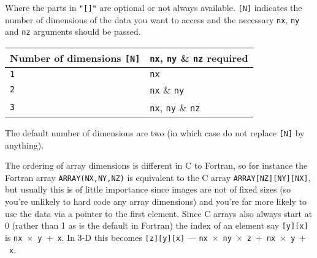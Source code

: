 \documentclass[twoside,11pt,nolof]{starlink}
\providecommand{\myverb}[1]{{\texttt{#1}}}
\begin{document}
Where the parts in \texttt{"[]"} are optional or not always available.
\texttt{[N]} indicates the number of dimensions of the data you want to access
and the necessary \texttt{nx}, \texttt{ny} and \texttt{nz} arguments should
be passed.
\begin{small}
\begin{center}
\begin{tabular}{||l|l||}
\hline
Number of dimensions \texttt{[N]}    &    \texttt{nx}, \texttt{ny} \& \texttt{nz} required \\
\hline
     \texttt{1}                      &    \texttt{nx}       \\
     \texttt{2}                      &    \texttt{nx} \& \texttt{ny} \\
     \texttt{3}                      &    \texttt{nx}, \texttt{ny} \& \texttt{nz} \\
\hline
\end{tabular}
\end{center}
\end{small}
The default number of dimensions are two (in which case do not replace
\texttt{[N]} by anything).

The ordering of array dimensions is different in C to Fortran, so for
instance the Fortran array \myverb{ARRAY(NX,NY,NZ)} is equivalent to
the C array \myverb{ARRAY[NZ][NY][NX]}, but usually this is of little
importance since images are not of fixed sizes (so you're unlikely to
hard code any array dimensions) and you're far more likely to use the
data via a pointer to the first element. Since C arrays also always start
at 0 (rather than 1 as is the default in Fortran) the index of an
element say \texttt{[y][x]} is
\texttt{nx}~$\times$~\texttt{y}~$+$~\texttt{x}. In 3-D this becomes
\texttt{[z][y][x]} ---
\texttt{nx}~$\times$~\texttt{ny}~$\times$~\texttt{z}~$+$~\texttt{nx}~$\times$~\texttt{y}~$+$~\texttt{x}.
\end{document}
